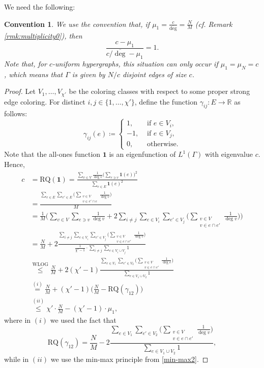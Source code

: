 \documentclass{article}
\newcommand{\R}{\mathbb{R}}
\newcommand{\RQ}{\textrm{RQ}}
\theoremstyle{plain}
\newtheorem{convention}{Convention}
\theoremstyle{definition}
\theoremstyle{remark}
\begin{document}
We need the following:
\begin{convention}\label{conv:2}
We use the convention that, if $\mu_1 = \frac{c}{\overline{\deg}} = \frac NM$ (cf. Remark \ref{rmk:multiplicity0}), then
\[
\frac{c-\mu_1}{c/\overline{\deg}-\mu_1} = 1.
\]
Note that, for $c$-uniform hypergraphs, this situation can only occur if $\mu_1=\mu_N=c$, which means that $\Gamma$ is given by $N/c$ disjoint edges of size $c$.
    
\end{convention}


\begin{proof}
    Let $V_1,\ldots, V_{\chi'}$ be the coloring classes with respect to some proper strong edge coloring. For distinct $i,j\in\{1,\ldots,\chi'\}$, define the function $\gamma_{ij}\colon E\to\R$ as follows:
    \begin{equation}\label{eq:gammaij}
    \gamma_{ij}(e)\coloneqq \begin{cases}
        1, &\text{ if } e\in V_i,\\
        -1,&\text{ if }e\in V_j,\\
        0, &\text{ otherwise.}
    \end{cases}
    \end{equation}
    Note that the all-ones function $\boldsymbol 1$ is an eigenfunction of $L^1(\Gamma)$ with eigenvalue $c$. Hence,
    \begin{align*}
        c &= \RQ(\boldsymbol 1) = \frac{\sum_{v\in V}\frac 1{\deg v}\biggl(\sum_{e\ni v}\boldsymbol 1(e)\biggr)^2}{\sum_{e\in E}\boldsymbol 1(e)^2}\\
        &= \frac{\sum_{e\in E}\sum_{e'\in E}\biggl(\sum_{\substack{v\in V\\v\in e'\cap e}}\frac1{\deg v}\biggr)}{M}\\
        &= \frac1{M}\biggl( \sum_{v\in V}\sum_{e\ni v}\frac1{\deg v} + 2\sum_{i\neq j}\sum_{e\in V_i}\sum_{e'\in V_j}\biggl(\sum_{\substack{v\in V\\ v\in e\cap e'}}\frac1{\deg v}\biggr)\biggr)\\
        &= \frac{N}{M} + 2\frac{\sum_{i\neq j}\sum_{e\in V_i}\sum_{e'\in V_j}\biggl(\sum_{\substack{v\in V\\ v\in e\cap e'}}\frac1{\deg v}\biggr)}{\frac1{\chi'-1}\cdot \sum_{i\neq j}\sum_{e\in V_i\cup V_j}1}\\
        &\overset{\text{WLOG}}{\leq} \frac{N}{M} + 2(\chi'-1) \frac{\sum_{e\in V_1}\sum_{e'\in V_2}\biggl(\sum_{\substack{v\in V\\ v\in e\cap e'}}\frac1{\deg v}\biggr)}{\sum_{e\in V_1\cup V_2}1}\\
        &\overset{(i)}{=} \frac{N}{M} + (\chi'-1)\biggl(\frac{N}{M}-\RQ(\gamma_{12})\biggr)\\
        &\overset{(ii)}{\leq} \chi' \cdot \frac{N}{M}-(\chi'-1)\cdot \mu_1,
    \end{align*}
    where in $(i)$ we used the fact that
    \[
    \RQ(\gamma_{12}) = \frac NM - 2\frac{\sum_{e\in V_1}\sum_{e'\in V_2}\biggl(\sum_{\substack{v\in V\\ v\in e\cap e'}}\frac1{\deg v}\biggr)}{\sum_{e\in V_1\cup V_2}1},
    \]
    while in $(ii)$ we use the min-max principle from \eqref{min-max2}.
    

\end{proof}
\end{document}
